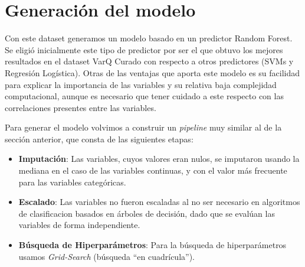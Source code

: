 




\section{Generación del modelo}

Con este dataset generamos un modelo basado en un predictor Random Forest. 
Se eligió inicialmente este tipo de predictor por ser el que obtuvo los mejores resultados en el dataset VarQ Curado con respecto a otros predictores (SVMs y Regresión Logística). Otras de las ventajas que aporta este modelo es su facilidad para explicar la importancia de las variables y su relativa baja complejidad computacional, aunque es necesario que tener cuidado a este respecto con las correlaciones presentes entre las variables.

Para generar el modelo volvimos a construir un \textit{pipeline} muy similar al de la sección anterior, que consta de las siguientes etapas:

\begin{itemize}
 
\item \textbf{Imputación}: Las variables, cuyos valores eran nulos, se imputaron usando la mediana en el caso de las variables continuas, y con el valor más frecuente para las variables categóricas. 
\item \textbf{Escalado}: Las variables no fueron escaladas al no ser necesario en algoritmos de clasificacion basados en árboles de decisión, dado que se evalúan las variables de forma independiente. 
\item \textbf{Búsqueda de Hiperparámetros}: Para la búsqueda de hiperparámetros usamos \textit{Grid-Search} (búsqueda ``en cuadrícula'').
\end{itemize}


